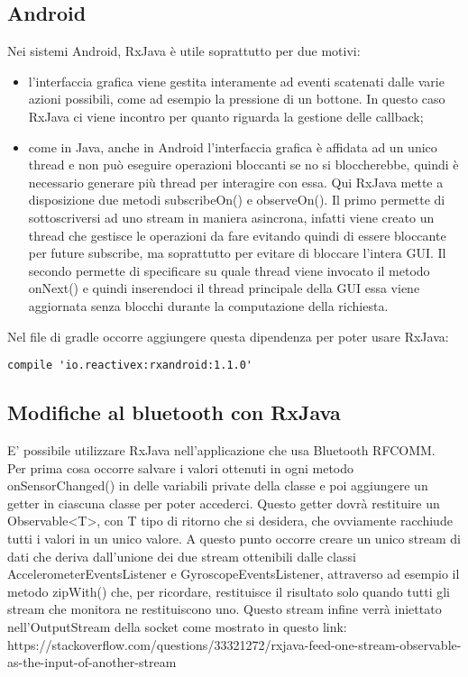 \documentclass{article}
\begin{document}
\subsection{Android}
Nei sistemi Android, RxJava è utile soprattutto per due motivi: 
\begin{itemize}
    \item l’interfaccia grafica viene gestita interamente ad eventi scatenati dalle varie azioni possibili, come ad esempio la pressione di un bottone. In questo caso RxJava ci viene incontro per quanto riguarda la gestione delle callback;
    \item come in Java, anche in Android l’interfaccia grafica è affidata ad un unico thread e non può eseguire operazioni bloccanti se no si bloccherebbe, quindi è necessario generare più thread per interagire con essa. Qui RxJava mette a disposizione due metodi subscribeOn() e observeOn(). Il primo permette di sottoscriversi ad uno stream in maniera asincrona, infatti viene creato un thread che gestisce le operazioni da fare evitando quindi di essere bloccante per future subscribe, ma soprattutto per evitare di bloccare l’intera GUI. Il secondo permette di specificare su quale thread viene invocato il metodo onNext() e quindi inserendoci il thread principale della GUI essa viene aggiornata senza blocchi durante la computazione della richiesta.
\end{itemize} 
Nel file di gradle occorre aggiungere questa dipendenza per poter usare RxJava:
\begin{lstlisting}
compile 'io.reactivex:rxandroid:1.1.0'
\end{lstlisting}
\subsection{Modifiche al bluetooth con RxJava}
E' possibile utilizzare RxJava nell'applicazione che usa Bluetooth RFCOMM.\\
Per prima cosa occorre salvare i valori ottenuti in ogni metodo onSensorChanged() in delle variabili private della classe e poi aggiungere un getter in ciascuna classe per poter accederci. Questo getter dovrà restituire un Observable<T>, con T tipo di ritorno che si desidera, che ovviamente racchiude tutti i valori in un unico valore. A questo punto occorre creare un unico stream di dati che deriva dall'unione dei due stream ottenibili dalle classi AccelerometerEventsListener e GyroscopeEventsListener, attraverso ad esempio il metodo zipWith() che, per ricordare, restituisce il risultato solo quando tutti gli stream che monitora ne restituiscono uno. Questo stream infine verrà iniettato nell'OutputStream della socket come mostrato in questo link:\\
https://stackoverflow.com/questions/33321272/rxjava-feed-one-stream-observable-as-the-input-of-another-stream \\
\newpage
\end{document}
